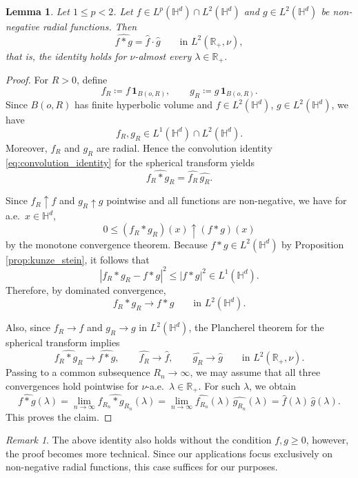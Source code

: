 \documentclass[11pt,a4paper]{article}
\theoremstyle{plain}
\newtheorem{lemma}[theorem]{Lemma}
\theoremstyle{definition}
\theoremstyle{remark}
\newtheorem{remark}[theorem]{Remark}
\def\HH{\mathbb{H}}
\def\RR{\mathbb{R}}
\begin{document}
\begin{lemma}\label{lem:convolution}
Let $1\leq p<2$. Let $f\in L^p(\HH^d)\cap L^2(\HH^d)$ and $g\in L^2(\HH^d)$ be non-negative radial functions.
Then
\[
\widehat{f*g}=\widehat f \cdot \widehat g
\qquad\text{in }L^2(\RR_+,\nu),
\]
that is, the identity holds for $\nu$-almost every $\lambda\in\RR_+$.
\end{lemma}
\begin{proof}
For $R>0$, define
\[
f_R\coloneqq f\,\mathbf 1_{B(o,R)},
\qquad
g_R\coloneqq g\,\mathbf 1_{B(o,R)}.
\]
Since $B(o,R)$ has finite hyperbolic volume and $f\in L^2(\HH^d)$, $g\in L^2(\HH^d)$, we have
\[
f_R,g_R\in L^1(\HH^d)\cap L^2(\HH^d).
\]
Moreover, $f_R$ and $g_R$ are radial. Hence the  convolution identity \eqref{eq:convolution_identity} for the spherical transform yields
\[
\widehat{f_R*g_R}=\widehat{f_R}\,\widehat{g_R}.
\]

Since $f_R\uparrow f$ and $g_R\uparrow g$ pointwise and all functions are non-negative, we have for a.e.\ $x\in\HH^d$,
\[
0\le (f_R*g_R)(x)\uparrow (f*g)(x)
\]
by the monotone convergence theorem. Because $f*g\in L^2(\HH^d)$ by Proposition \ref{prop:kunze_stein}, it follows that
\[
|f_R*g_R-f*g|^2\le |f*g|^2\in L^1(\HH^d).
\]
Therefore, by dominated convergence,
\[
f_R*g_R\to f*g \qquad\text{in }L^2(\HH^d).
\]

Also, since $f_R\to f$ and $g_R\to g$ in $L^2(\HH^d)$, the Plancherel theorem for the spherical transform implies
\[
\widehat{f_R*g_R}\to \widehat{f*g},\qquad
\widehat{f_R}\to \widehat f,\qquad
\widehat{g_R}\to \widehat g
\qquad\text{in }L^2(\RR_+,\nu).
\]
Passing to a common subsequence $R_n\to\infty$, we may assume that all three convergences hold pointwise for $\nu$-a.e.\ $\lambda\in\RR_+$. For such $\lambda$, we obtain
\[
\widehat{f*g}(\lambda)
=\lim_{n\to\infty}\widehat{f_{R_n}*g_{R_n}}(\lambda)
=\lim_{n\to\infty}\widehat{f_{R_n}}(\lambda)\,\widehat{g_{R_n}}(\lambda)
=\widehat f(\lambda)\,\widehat g(\lambda).
\]
This proves the claim.
\end{proof}

\begin{remark}
    The above identity also holds without the condition $f,g \geq 0$, however, the proof becomes more technical. Since our applications focus exclusively on non-negative radial functions, this case suffices for our purposes.
\end{remark}
\end{document}
